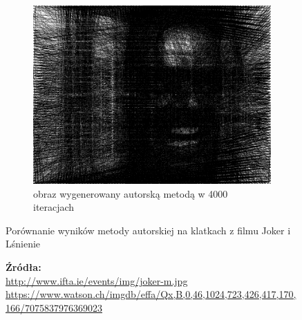 \documentclass[a4paper, 12pt, polish, twoside]{extreport}
\begin{document}
\begin{figure}[H]
\begin{subfigure}{0.24\textwidth}
        \label{comp-comp-joker-shining-j}
    \end{subfigure}
    \begin{subfigure}{0.24\textwidth}
        \centering
        \includegraphics[width = \textwidth]{img/6-comp/shining_r_i4000_c20_inv0_bg10_obj1_ed1.png}
        \caption{obraz wygenerowany autorską metodą w 4000 iteracjach}
        \label{comp-comp-joker-shining-k}
    \end{subfigure}
    \caption{Porównanie wyników metody autorskiej na klatkach z filmu Joker i Lśnienie}
    \caption*{\footnotesize{\textbf{Źródła:}\\
    \url{http://www.ifta.ie/events/img/joker-m.jpg}\\
    {\url{https://www.watson.ch/imgdb/effa/Qx,B,0,46,1024,723,426,417,170,166/7075837976369023}}}}
    \label{comp-comp-joker-shining}
    \end{figure}
    
\end{document}
